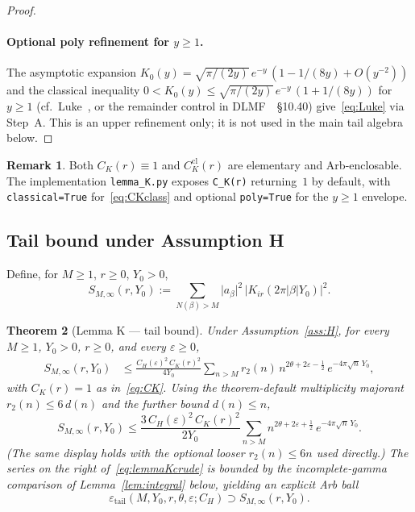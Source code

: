 \documentclass[11pt]{amsart}
\newtheorem{theorem}{Theorem}[section]
\theoremstyle{definition}
\newtheorem{remark}[theorem]{Remark}
\newcommand{\abs}[1]{\lvert#1\rvert}
\newcommand{\eps}{\varepsilon}
\newcommand{\tht}{\theta}
\begin{document}
\begin{proof}
\paragraph{Optional poly refinement for $y\ge 1$.}
The asymptotic expansion
$K_0(y)=\sqrt{\pi/(2y)}\,e^{-y}\,(1-1/(8y)+O(y^{-2}))$
and the classical inequality
$0<K_0(y)\le \sqrt{\pi/(2y)}\,e^{-y}\,(1+1/(8y))$
for $y\ge 1$ (cf.\ Luke~\cite{Luke}, or the remainder control in
DLMF~\cite{DLMF}~\S10.40) give~\eqref{eq:Luke} via Step~A.  This is an
upper refinement only; it is not used in the main tail algebra below.
\end{proof}

\begin{remark}
Both $C_K(r)\equiv 1$ and $C_K^{\mathrm{cl}}(r)$ are elementary and
Arb-enclosable.  The implementation \texttt{lemma\_K.py} exposes
\texttt{C\_K(r)} returning~$1$ by default, with
\texttt{classical=True} for~\eqref{eq:CKclass} and optional
\texttt{poly=True} for the $y\ge 1$ envelope.
\end{remark}

\subsection{Tail bound under Assumption H}

Define, for $M\ge 1$, $r\ge 0$, $Y_0>0$,
\begin{equation}
\label{eq:SMinf}
  S_{M,\infty}(r,Y_0)
  :=
  \sum_{N(\beta)>M}
  \abs{a_\beta}^2\,
  \abs{K_{ir}(2\pi\abs{\beta}Y_0)}^2.
\end{equation}

\begin{theorem}[Lemma K --- tail bound]
\label{thm:lemmaK}
Under Assumption~\ref{ass:H}, for every $M\ge 1$, $Y_0>0$, $r\ge 0$, and
every $\eps\ge 0$,
\begin{equation}
\label{eq:lemmaK}
\begin{aligned}
  S_{M,\infty}(r,Y_0)
  &\le
  \frac{C_H(\eps)^2\,C_K(r)^2}{4Y_0}
  \sum_{n>M}
  r_2(n)\,
  n^{2\tht+2\eps-\tfrac12}\,
  e^{-4\pi\sqrt{n}\,Y_0},
\end{aligned}
\end{equation}
with $C_K(r)=1$ as in~\eqref{eq:CK}.  Using the theorem-default multiplicity
majorant $r_2(n)\le 6\,d(n)$ and the further bound $d(n)\le n$,
\begin{equation}
\label{eq:lemmaKcrude}
  S_{M,\infty}(r,Y_0)
  \le
  \frac{3\,C_H(\eps)^2\,C_K(r)^2}{2Y_0}
  \sum_{n>M}
  n^{2\tht+2\eps+\tfrac12}\,
  e^{-4\pi\sqrt{n}\,Y_0}.
\end{equation}
(The same display holds with the optional looser $r_2(n)\le 6n$ used
directly.)  The series on the right of~\eqref{eq:lemmaKcrude} is bounded
by the incomplete-gamma comparison of Lemma~\ref{lem:integral} below,
yielding an explicit Arb ball
\[
  \eps_{\mathrm{tail}}(M,Y_0,r,\tht,\eps;C_H)
  \supset
  S_{M,\infty}(r,Y_0).
\]
\end{theorem}
\end{document}
